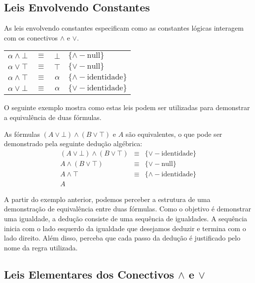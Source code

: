 \subsection{Leis Envolvendo Constantes}

As leis envolvendo constantes especificam como as constantes lógicas
interagem com os conectivos $\land$ e $\lor$.

\begin{table}[h]
    \begin{tabular}{|cccl|}
        \hline
             $\alpha \land \bot$ & $\equiv$ & $\bot$ &
             $\{\land-\text{null}\}$\\
             $\alpha \lor \top$ & $\equiv$ & $\top$ &
             $\{\lor-\text{null}\}$\\
             $\alpha \land \top$ & $\equiv$ & $\alpha$ & $\{\land-\text{identidade}\}$\\
             $\alpha \lor \bot$ & $\equiv$ & $\alpha$ & $\{\lor-\text{identidade}\}$\\
        \hline
    \end{tabular}
    \centering
\end{table}

O seguinte exemplo mostra como estas leis podem ser utilizadas para
demonstrar a equivalência de duas fórmulas.

\begin{Example}
As fórmulas $(A \lor \bot)\land(B \lor \top)$ e $A$ são
equivalentes, o que pode ser demonstrado pela seguinte dedução
algébrica:
\[
\begin{array}{lcl}
(A \lor \bot)\land(B \lor \top) & \equiv &\{\lor-\text{identidade}\} \\
A \land (B\lor \top) & \equiv & \{\lor-\text{null}\}\\
A \land \top & \equiv & \{\land-\text{identidade}\}\\
A & &
\end{array}
\]
\end{Example}

A partir do exemplo anterior, podemos perceber a estrutura de uma
demonstração de equivalência entre duas fórmulas. Como o objetivo é
demonstrar uma igualdade, a dedução consiste de uma sequência de
igualdades. A sequência inicia com o lado esquerdo da igualdade que
desejamos deduzir e termina com o lado direito. Além disso, perceba
que cada passo da dedução é justificado pelo nome da regra utilizada.


\subsection{Leis Elementares dos Conectivos $\land$ e $\lor$}

